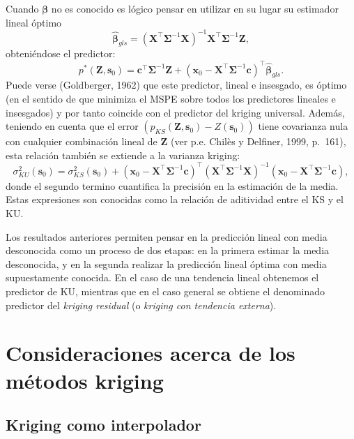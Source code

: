 \documentclass[
  spanish,
]{book}
\theoremstyle{break}
\theoremstyle{definition}
\theoremstyle{definition}
\theoremstyle{definition}
\theoremstyle{definition}
\theoremstyle{remark}
\begin{document}
Cuando \(\boldsymbol{\beta}\) no es conocido es lógico pensar en utilizar en su lugar su estimador lineal óptimo
\[\hat{\boldsymbol{\beta}}_{gls} =(\mathbf{X}^{\top}\boldsymbol{\Sigma}^{-1} \mathbf{X})^{-1} \mathbf{X}^{\top}\boldsymbol{\Sigma}^{-1} \mathbf{Z},\]
obteniéndose el predictor:
\[p^{\ast}(\mathbf{Z},\mathbf{s}_{0}) = \mathbf{c^\top }\boldsymbol{\Sigma}^{-1}\mathbf{Z} + (\mathbf{x}_0-\mathbf{X}^\top\boldsymbol{\Sigma}^{-1} \mathbf{c})^\top \hat{\boldsymbol{\beta}}_{gls}.\]
Puede verse (Goldberger, 1962) que este predictor, lineal e insesgado, es óptimo (en el sentido de que minimiza el MSPE sobre todos los predictores lineales e insesgados) y por tanto coincide con el predictor del kriging universal.
Además, teniendo en cuenta que el error \(\left( p_{KS} (\mathbf{Z},\mathbf{s}_{0})-Z(\mathbf{s}_{0})\right)\) tiene covarianza nula con cualquier combinación lineal de \(\mathbf{Z}\) (ver p.e. Chilès y Delfiner, 1999, p.~161), esta relación también se extiende a la varianza kriging:
\[\sigma_{KU}^{2} (\mathbf{s}_{0})=\sigma_{KS}^{2} (\mathbf{s}_{0}
)+(\mathbf{x}_0-\mathbf{X^\top }\boldsymbol{\Sigma}^{-1} \mathbf{c})^\top \left(
\mathbf{X^\top }\boldsymbol{\Sigma}^{-1} \mathbf{X}\right)^{-1}
(\mathbf{x}_0-\mathbf{X^\top }\boldsymbol{\Sigma}^{-1} \mathbf{c}),\]
donde el segundo termino cuantifica la precisión en la estimación de la media.
Estas expresiones son conocidas como la relación de aditividad entre el KS y el KU.

Los resultados anteriores permiten pensar en la predicción lineal con media desconocida como un proceso de dos etapas: en la primera estimar la media desconocida, y en la segunda realizar la predicción lineal óptima con media supuestamente conocida.
En el caso de una tendencia lineal obtenemos el predictor de KU, mientras que en el caso general se obtiene el denominado predictor del \emph{kriging residual} (o \emph{kriging con tendencia externa}).

\hypertarget{consideraciones-kriging}{%
\section{Consideraciones acerca de los métodos kriging}\label{consideraciones-kriging}}

\hypertarget{kriging-interpolador}{%
\subsection{Kriging como interpolador}\label{kriging-interpolador}}
\end{document}
